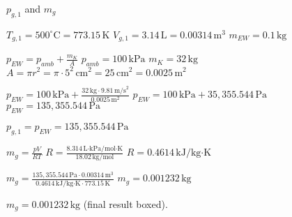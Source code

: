 \( p_{g,1} \) and \( m_g \)

\( T_{g,1} = 500^\circ \text{C} = 773.15 \, \text{K} \)  
\( V_{g,1} = 3.14 \, \text{L} = 0.00314 \, \text{m}^3 \)  
\( m_{EW} = 0.1 \, \text{kg} \)  

\( p_{EW} = p_{amb} + \frac{m_K}{A} \)  
\( p_{amb} = 100 \, \text{kPa} \)  
\( m_K = 32 \, \text{kg} \)  
\( A = \pi r^2 = \pi \cdot 5^2 \, \text{cm}^2 = 25 \, \text{cm}^2 = 0.0025 \, \text{m}^2 \)  

\( p_{EW} = 100 \, \text{kPa} + \frac{32 \, \text{kg} \cdot 9.81 \, \text{m/s}^2}{0.0025 \, \text{m}^2} \)  
\( p_{EW} = 100 \, \text{kPa} + 35,355.544 \, \text{Pa} \)  
\( p_{EW} = 135,355.544 \, \text{Pa} \)  

\( p_{g,1} = p_{EW} = 135,355.544 \, \text{Pa} \)  

\( m_g = \frac{p V}{R T} \)  
\( R = \frac{8.314 \, \text{L·kPa}/\text{mol·K}}{18.02 \, \text{kg}/\text{mol}} \)  
\( R = 0.4614 \, \text{kJ}/\text{kg·K} \)  

\( m_g = \frac{135,355.544 \, \text{Pa} \cdot 0.00314 \, \text{m}^3}{0.4614 \, \text{kJ}/\text{kg·K} \cdot 773.15 \, \text{K}} \)  
\( m_g = 0.001232 \, \text{kg} \)  

\( m_g = 0.001232 \, \text{kg} \) (final result boxed).